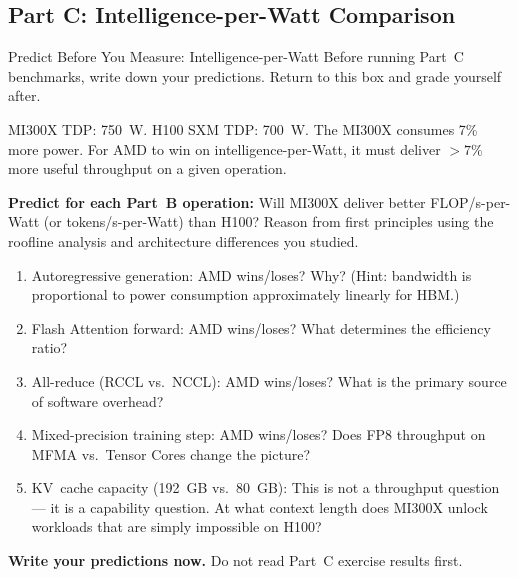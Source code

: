 \subsection{Part C: Intelligence-per-Watt Comparison}

\begin{thinkfirst}{Predict Before You Measure: Intelligence-per-Watt}
Before running Part~C benchmarks, write down your predictions. Return to this box and grade yourself after.

MI300X TDP: 750~W. H100 SXM TDP: 700~W. The MI300X consumes 7\% more power. For AMD to win on intelligence-per-Watt, it must deliver $>7\%$ more useful throughput on a given operation.

\textbf{Predict for each Part~B operation:} Will MI300X deliver better FLOP/s-per-Watt (or tokens/s-per-Watt) than H100? Reason from first principles using the roofline analysis and architecture differences you studied.

\begin{enumerate}
  \item Autoregressive generation: AMD wins/loses? Why? (Hint: bandwidth is proportional to power consumption approximately linearly for HBM.)
  \item Flash Attention forward: AMD wins/loses? What determines the efficiency ratio?
  \item All-reduce (RCCL vs.\ NCCL): AMD wins/loses? What is the primary source of software overhead?
  \item Mixed-precision training step: AMD wins/loses? Does FP8 throughput on MFMA vs.\ Tensor Cores change the picture?
  \item KV~cache capacity (192~GB vs.\ 80~GB): This is not a throughput question --- it is a capability question. At what context length does MI300X unlock workloads that are simply impossible on H100?
\end{enumerate}

\textbf{Write your predictions now.} Do not read Part~C exercise results first.
\end{thinkfirst}

